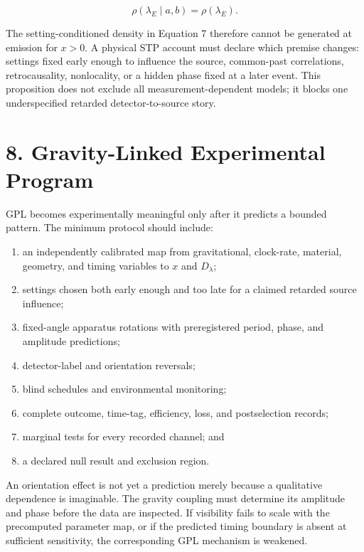 \documentclass[
  american,
  11pt,
  letterpaper,
]{article}
\providecommand{\tightlist}{%
  \setlength{\itemsep}{0pt}\setlength{\parskip}{0pt}}
\begin{document}
\begin{equation}
\rho(\lambda_E\mid a,b)=\rho(\lambda_E).
\tag{20}
\end{equation}

The setting-conditioned density in Equation 7 therefore cannot be generated at emission for \(x>0\). A physical STP account must declare which premise changes: settings fixed early enough to influence the source, common-past correlations, retrocausality, nonlocality, or a hidden phase fixed at a later event. This proposition does not exclude all measurement-dependent models; it blocks one underspecified retarded detector-to-source story.

\section{8. Gravity-Linked Experimental Program}\label{gravity-linked-experimental-program}

GPL becomes experimentally meaningful only after it predicts a bounded pattern. The minimum protocol should include:

\begin{enumerate}
\def\labelenumi{\arabic{enumi}.}
\tightlist
\item
  an independently calibrated map from gravitational, clock-rate, material, geometry, and timing variables to \(x\) and \(D_\lambda\);
\item
  settings chosen both early enough and too late for a claimed retarded source influence;
\item
  fixed-angle apparatus rotations with preregistered period, phase, and amplitude predictions;
\item
  detector-label and orientation reversals;
\item
  blind schedules and environmental monitoring;
\item
  complete outcome, time-tag, efficiency, loss, and postselection records;
\item
  marginal tests for every recorded channel; and
\item
  a declared null result and exclusion region.
\end{enumerate}

An orientation effect is not yet a prediction merely because a qualitative dependence is imaginable. The gravity coupling must determine its amplitude and phase before the data are inspected. If visibility fails to scale with the precomputed parameter map, or if the predicted timing boundary is absent at sufficient sensitivity, the corresponding GPL mechanism is weakened.
\end{document}
